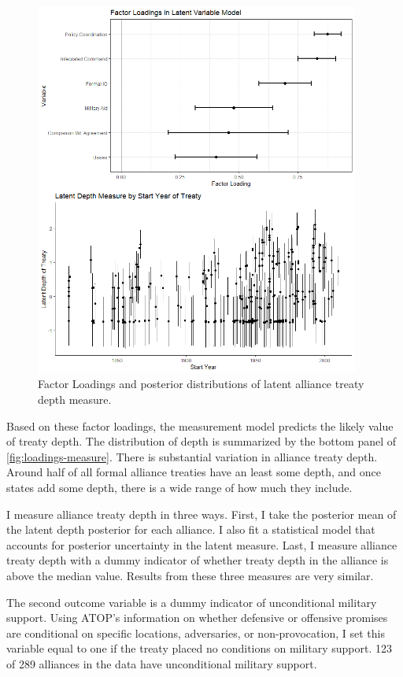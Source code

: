 \documentclass[12pt]{article}
\begin{document}
\begin{figure}[hbtp]
\centering
\includegraphics[width=0.95\textwidth]{../figures/loadings-measure.png}
\caption{Factor Loadings and posterior distributions of latent alliance treaty depth measure.}
\label{fig:loadings-measure}
\end{figure}


Based on these factor loadings, the measurement model predicts the likely value of treaty depth. 
The distribution of depth is summarized by the bottom panel of \autoref{fig:loadings-measure}. 
There is substantial variation in alliance treaty depth. 
Around half of all formal alliance treaties have an least some depth, and once states add some depth, there is a wide range of how much they include.


I measure alliance treaty depth in three ways.
First, I take the posterior mean of the latent depth posterior for each alliance. 
I also fit a statistical model that accounts for posterior uncertainty in the latent measure. 
Last, I measure alliance treaty depth with a dummy indicator of whether treaty depth in the alliance is above the median value. 
Results from these three measures are very similar. 


The second outcome variable is a dummy indicator of unconditional military support. 
Using ATOP's information on whether defensive or offensive promises are conditional on specific locations, adversaries, or non-provocation, I set this variable equal to one if the treaty placed no conditions on military support.
123 of 289 alliances in the data have unconditional military support. 
\end{document}
